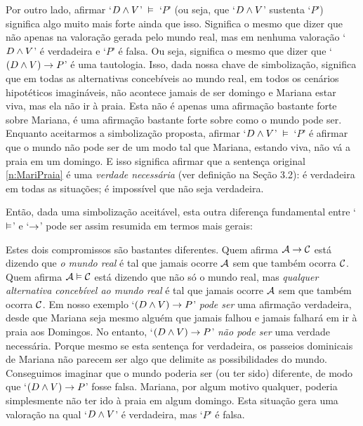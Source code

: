Por outro lado, afirmar \mbox{`$D \wedge V$' $\vDash$ `$P$'} (ou seja, que `$D \wedge V$' sustenta `$P$') significa algo muito mais forte ainda que isso.
Significa o mesmo que dizer que não apenas na valoração gerada pelo mundo real, mas em nenhuma valoração `$D \wedge V$' é verdadeira e `$P$' é falsa.
Ou seja, significa o mesmo que dizer que `$(D \wedge V) \rightarrow P$' é uma tautologia.
Isso, dada nossa chave de simbolização, significa que em todas as alternativas concebíveis ao mundo real, em todos os cenários hipotéticos imagináveis, não acontece jamais de ser domingo e Mariana estar viva, mas ela não ir à praia.
Esta não é apenas uma afirmação bastante forte sobre Mariana, é uma afirmação bastante forte sobre como o mundo pode ser.
Enquanto aceitarmos a simbolização proposta, afirmar \mbox{`$D \wedge V$' $\vDash$ `$P$'} é afirmar que o mundo não pode ser de um modo tal que Mariana, estando viva, não vá a praia em um domingo.
E isso significa afirmar que a sentença original \ref{n:MariPraia} é uma \emph{verdade necessária} (ver definição na Seção 3.2): é verdadeira em todas as situações; é impossível que não seja verdadeira.

Então, dada uma simbolização aceitável, esta outra diferença fundamental entre `$\vDash$' e `$\rightarrow$' pode ser assim resumida em termos mais gerais:

Estes dois compromissos são bastantes diferentes.
Quem afirma $\mathcal{A} \rightarrow \mathcal{C}$ está dizendo que \emph{o mundo real} é tal que jamais ocorre $\mathcal{A}$ sem que também ocorra $\mathcal{C}$.
Quem afirma $\mathcal{A} \vDash \mathcal{C}$ está dizendo que não só o mundo real, mas \emph{qualquer alternativa concebível ao mundo real} é tal que jamais ocorre $\mathcal{A}$ sem que também ocorra $\mathcal{C}$.
Em nosso exemplo `$(D \wedge V) \rightarrow P$' \emph{pode ser} uma afirmação verdadeira, desde que Mariana seja mesmo alguém que jamais falhou e jamais falhará em ir à praia aos Domingos.
No entanto, `$(D \wedge V) \rightarrow P$' \emph{não pode ser} uma verdade necessária.
Porque mesmo se esta sentença for verdadeira, os passeios dominicais de Mariana não parecem ser algo que delimite as possibilidades do mundo.
Conseguimos imaginar que o mundo poderia ser (ou ter sido) diferente, de modo que `$(D \wedge V) \rightarrow P$' fosse falsa.
Mariana, por algum motivo qualquer, poderia simplesmente não ter ido à praia em algum domingo.
Esta situação gera uma valoração na qual `$D \wedge V$' é verdadeira, mas `$P$' é falsa.

